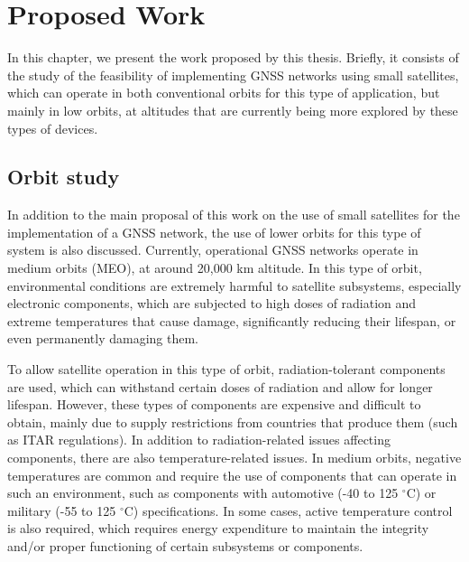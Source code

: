 %
%
%
%
%

%
%
%
%
%

\chapter{Proposed Work} \label{ch:proposed-work}

In this chapter, we present the work proposed by this thesis. Briefly, it consists of the study of the feasibility of implementing GNSS networks using small satellites, which can operate in both conventional orbits for this type of application, but mainly in low orbits, at altitudes that are currently being more explored by these types of devices.

\section{Orbit study}

In addition to the main proposal of this work on the use of small satellites for the implementation of a GNSS network, the use of lower orbits for this type of system is also discussed. Currently, operational GNSS networks operate in medium orbits (MEO), at around 20,000 km altitude. In this type of orbit, environmental conditions are extremely harmful to satellite subsystems, especially electronic components, which are subjected to high doses of radiation and extreme temperatures that cause damage, significantly reducing their lifespan, or even permanently damaging them.

To allow satellite operation in this type of orbit, radiation-tolerant components are used, which can withstand certain doses of radiation and allow for longer lifespan. However, these types of components are expensive and difficult to obtain, mainly due to supply restrictions from countries that produce them (such as ITAR regulations). In addition to radiation-related issues affecting components, there are also temperature-related issues. In medium orbits, negative temperatures are common and require the use of components that can operate in such an environment, such as components with automotive (-40 to 125 $^{\circ}$C) or military (-55 to 125 $^{\circ}$C) specifications. In some cases, active temperature control is also required, which requires energy expenditure to maintain the integrity and/or proper functioning of certain subsystems or components.

